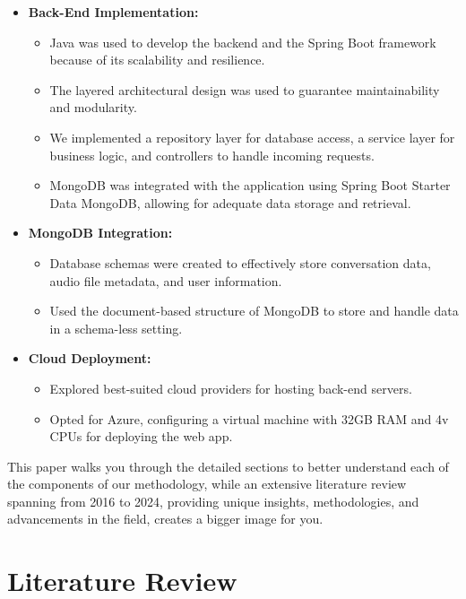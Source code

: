 \documentclass[conference]{IEEEtran}
\begin{document}
\begin{itemize}
\begin{itemize}
        \end{itemize}
        \item \textbf{Back-End Implementation:}
        \begin{itemize}
            \item Java was used to develop the backend and the Spring Boot framework because of its scalability and resilience.
            \item The layered architectural design was used to guarantee maintainability and modularity.
            \item We implemented a repository layer for database access, a service layer for business logic, and controllers to handle incoming requests.
            \item MongoDB was integrated with the application using Spring Boot Starter Data MongoDB, allowing for adequate data storage and retrieval.
        \end{itemize}
    \item \textbf{MongoDB Integration:}
    \begin{itemize}
        \item Database schemas were created to effectively store conversation data, audio file metadata, and user information.
        \item Used the document-based structure of MongoDB to store and handle data in a schema-less setting.
    \end{itemize}
    \item \textbf{Cloud Deployment:}
    \begin{itemize}
        \item Explored best-suited cloud providers for hosting back-end servers.
        \item Opted for Azure, configuring a virtual machine with 32GB RAM and 4v CPUs for deploying the web app.
    \end{itemize}
\end{itemize}

This paper walks you through the detailed sections to better understand each of the components of our methodology, while an extensive literature review spanning from 2016 to 2024, providing unique insights, methodologies, and advancements in the field, creates a bigger image for you. 

\section{Literature Review}
\end{document}
